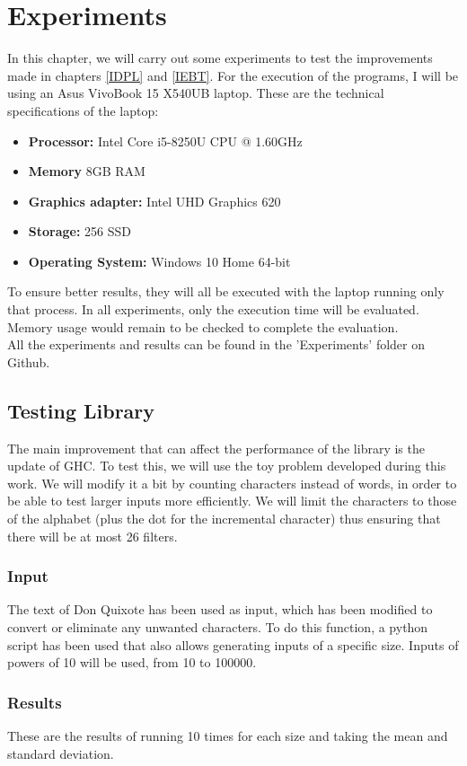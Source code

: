 \chapter{Experiments} \label{experiments}
In this chapter, we will carry out some experiments to test the improvements made in chapters \ref{IDPL} and \ref{IEBT}.
For the execution of the programs, I will be using an Asus VivoBook 15 X540UB laptop. These are the technical specifications of the laptop:
\begin{itemize}
  \item \textbf{Processor:}  Intel Core i5-8250U CPU @ 1.60GHz
  \item \textbf{Memory}  8GB RAM
  \item \textbf{Graphics adapter:} Intel UHD Graphics 620
  \item \textbf{Storage:} 256 SSD
  \item \textbf{Operating System:} Windows 10 Home 64-bit
\end{itemize}
To ensure better results, they will all be executed with the laptop running only that process.
In all experiments, only the execution time will be evaluated.
Memory usage would remain to be checked to complete the evaluation.\\
All the experiments and results can be found in the 'Experiments' folder on Github. \cite{forner_gomez_source_nodate}

\section{Testing Library}
The main improvement that can affect the performance of the library is the update of GHC.
To test this, we will use the toy problem developed during this work.
We will modify it a bit by counting characters instead of words, in order to be able to test larger inputs more efficiently.
We will limit the characters to those of the alphabet (plus the dot for the incremental character) thus ensuring that there will be at most 26 filters.
\subsection*{Input}
The text of Don Quixote has been used as input, which has been modified to convert or eliminate any unwanted characters.
To do this function, a python script has been used that also allows generating inputs of a specific size.
Inputs of powers of 10 will be used, from 10 to 100000.

\subsection*{Results}
These are the results of running 10 times for each size and taking the mean and standard deviation.

